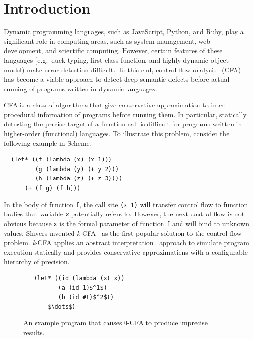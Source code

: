 \documentclass{article}
\begin{document}
\section{Introduction}
\label{Introduction}
Dynamic programming languages, such as JavaScript, Python, and Ruby, play a significant role in computing areas, such as system management, web development, and scientific computing.
However, certain features of these languages (e.g.\ duck-typing, first-class function, and highly dynamic object model) make error detection difficult.
To this end, control flow analysis~\cite{midtgaard2012control}
 (CFA) has become a viable approach to detect deep semantic defects before actual running of programs written in dynamic languages.

CFA is a class of algorithms that give conservative approximation to inter-procedural information of programs
before running them.
In particular, statically detecting the precise target of a function call is difficult for programs written in
higher-order (functional) languages.
To illustrate this problem, consider the following example in Scheme.
\begin{lstlisting}
  (let* ((f (lambda (x) (x 1)))
         (g (lambda (y) (+ y 2)))
         (h (lambda (z) (+ z 3))))
      (+ (f g) (f h)))
\end{lstlisting}
In the body of function \verb|f|, the call site \verb|(x 1)| will transfer control flow to function bodies that variable \verb|x| potentially refers to.
However, the next control flow is not obvious because \verb|x| is the formal parameter of function \verb|f| and will bind to
unknown values.
Shivers invented \textit{k}-CFA~\cite{shivers1991control}
as the first popular solution to the control flow problem.
\textit{k}-CFA applies an abstract interpretation~\cite{cousot1977abstract} approach to simulate program execution statically and
provides conservative approximations with a configurable hierarchy of precision.
 \begin{figure}
 \begin{lstlisting}
   (let* ((id (lambda (x) x))
          (a (id 1)$^1$)
          (b (id #t)$^2$))
       $\dots$)
 \end{lstlisting}
 \caption{An example program that causes 0-CFA to produce imprecise results.}
 \label{fig:eg1}
 \end{figure}
\end{document}

